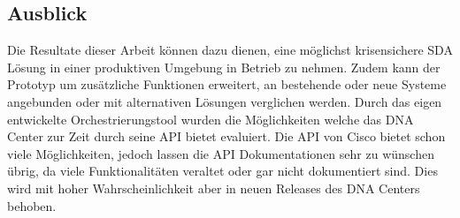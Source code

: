 \subsection{Ausblick}
Die Resultate dieser Arbeit können dazu dienen, eine möglichst krisensichere SDA Lösung in einer produktiven Umgebung in Betrieb zu nehmen. Zudem kann der Prototyp um zusätzliche Funktionen erweitert, an bestehende oder neue Systeme angebunden oder mit alternativen Lösungen verglichen werden. Durch das eigen entwickelte Orchestrierungstool wurden die Möglichkeiten welche das DNA Center zur Zeit durch seine API bietet evaluiert. Die API von Cisco bietet schon viele Möglichkeiten, jedoch lassen die API Dokumentationen sehr zu wünschen übrig, da viele Funktionalitäten veraltet oder gar nicht dokumentiert sind. Dies wird mit hoher Wahrscheinlichkeit aber in neuen Releases des DNA Centers behoben.
